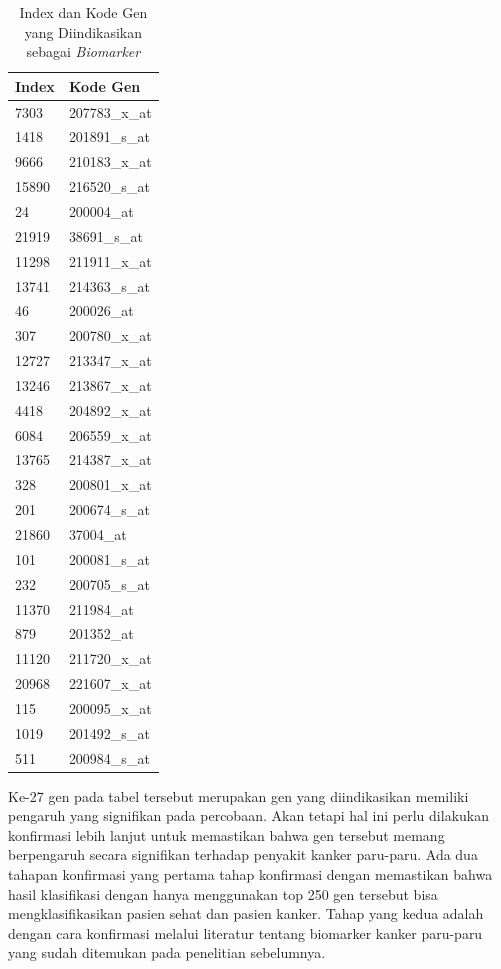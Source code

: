 \begin{table}
\centering
\caption{Index dan Kode Gen yang Diindikasikan sebagai \textit{Biomarker}}
\label{tab:indexgen}
\begin{tabular}{@{}ll@{}}
\toprule
Index & Kode Gen      \\ \midrule
7303  & 207783\_x\_at \\
1418  & 201891\_s\_at \\
9666  & 210183\_x\_at \\
15890 & 216520\_s\_at \\
24    & 200004\_at    \\
21919 & 38691\_s\_at  \\
11298 & 211911\_x\_at \\
13741 & 214363\_s\_at \\
46    & 200026\_at    \\
307   & 200780\_x\_at \\
12727 & 213347\_x\_at \\
13246 & 213867\_x\_at \\
4418  & 204892\_x\_at \\
6084  & 206559\_x\_at \\
13765 & 214387\_x\_at \\
328   & 200801\_x\_at \\
201   & 200674\_s\_at \\
21860 & 37004\_at     \\
101   & 200081\_s\_at \\
232   & 200705\_s\_at \\
11370 & 211984\_at    \\
879   & 201352\_at    \\
11120 & 211720\_x\_at \\
20968 & 221607\_x\_at \\
115   & 200095\_x\_at \\
1019  & 201492\_s\_at \\
511   & 200984\_s\_at \\ \bottomrule
\end{tabular}
\end{table}

Ke-27 gen pada tabel tersebut merupakan gen yang diindikasikan memiliki pengaruh yang signifikan pada percobaan. Akan tetapi hal ini perlu dilakukan konfirmasi lebih lanjut untuk memastikan bahwa gen tersebut memang berpengaruh secara signifikan terhadap penyakit kanker paru-paru. Ada dua tahapan konfirmasi yang pertama tahap konfirmasi dengan memastikan bahwa hasil klasifikasi dengan hanya menggunakan top 250 gen tersebut bisa mengklasifikasikan pasien sehat dan pasien kanker. Tahap yang kedua adalah dengan cara konfirmasi melalui literatur tentang biomarker kanker paru-paru yang sudah ditemukan pada penelitian sebelumnya.

